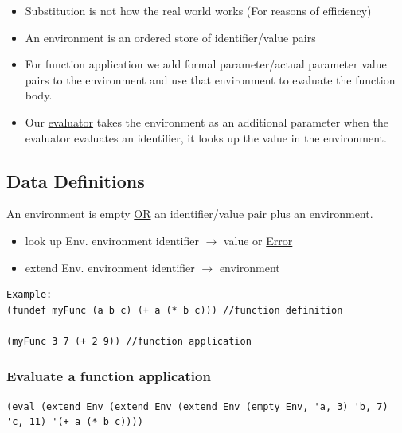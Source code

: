 \documentclass{article}
\begin{document}
\begin{flushleft}
\begin{flushleft}
\begin{itemize}
 \item Substitution is not how the real world works (For reasons of efficiency)
 \item An environment is an ordered store of identifier/value pairs
 \item For function application we add formal parameter/actual parameter value pairs to the environment and use that environment to evaluate the function body.
 \item Our \underline{evaluator} takes the environment as an additional parameter when the evaluator evaluates an identifier, it looks up the value in the environment.
\end{itemize}

\end{flushleft}
\subsection*{Data Definitions}
An environment is empty \underline{OR} an identifier/value pair plus an environment.
\begin{itemize}
\item look up Env. environment identifier $\rightarrow$ value or \underline{Error}
\item extend Env. environment identifier $\rightarrow$ environment
\end{itemize}
\begin{verbatim}
Example: 
(fundef myFunc (a b c) (+ a (* b c))) //function definition

(myFunc 3 7 (+ 2 9)) //function application
\end{verbatim}

\subsubsection*{Evaluate a function application}
\begin{verbatim}
(eval (extend Env (extend Env (extend Env (empty Env, 'a, 3) 'b, 7) 'c, 11) '(+ a (* b c))))


\end{verbatim}
\end{flushleft}
\end{document}
